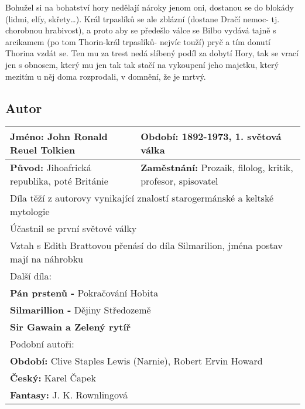Bohužel si na bohatství hory nedělají nároky jenom oni, dostanou se do blokády (lidmi, elfy, skřety…).
Král trpaslíků se ale zblázní (dostane Dračí nemoc- tj. chorobnou hrabivost), a proto aby se předešlo válce se Bilbo vydává tajně s arcikamem (po tom Thorin-král trpaslíků- nejvíc touží) pryč a tím donutí Thorina vzdát se.
Ten mu za trest nedá slíbený podíl za dobytí Hory, tak se vrací jen s obnosem, který mu jen tak tak stačí na vykoupení jeho majetku, který mezitím u něj doma rozprodali, v domnění, že je mrtvý.
\subsection*{Autor}
\begin{tabularx}{\linewidth}{l|l}
    \textbf{Jméno:} John Ronald Reuel Tolkien            & \textbf{Období:} 1892-1973, 1. světová válka                        \\
    \hline
    \textbf{Původ:} Jihoafrická republika, poté Británie & \textbf{Zaměstnání:} Prozaik, filolog, kritik, profesor, spisovatel \\
    \hline
    \multicolumn{2}{l}{Díla těží z autorovy vynikající znalostí starogermánské a keltské mytologie}                            \\
    \multicolumn{2}{l}{Účastnil se první světové války}                                                                        \\
    \multicolumn{2}{l}{Vztah s Edith Brattovou přenásí do díla Silmarilion, jména postav mají na náhrobku}                                                                                                       \\
    \hline
    \multicolumn{2}{l}{Další díla:}                                                                                            \\
    \multicolumn{2}{l}{\textbf{Pán prstenů -} Pokračování Hobita}                                                              \\
    \multicolumn{2}{l}{\textbf{Silmarillion -} Dějiny Středozemě}                                                              \\
    \multicolumn{2}{l}{\textbf{Sir Gawain a Zelený rytíř}}                                                                     \\
    \hline
    \multicolumn{2}{l}{Podobní autoři:}                                                                                        \\
    \multicolumn{2}{l}{\textbf{Období:} Clive Staples Lewis (Narnie), Robert Ervin Howard}                                     \\
    \multicolumn{2}{l}{\textbf{Český:} Karel Čapek}                                                                            \\
    \multicolumn{2}{l}{\textbf{Fantasy:} J. K. Rownlingová}                                                                    \\
\end{tabularx}
